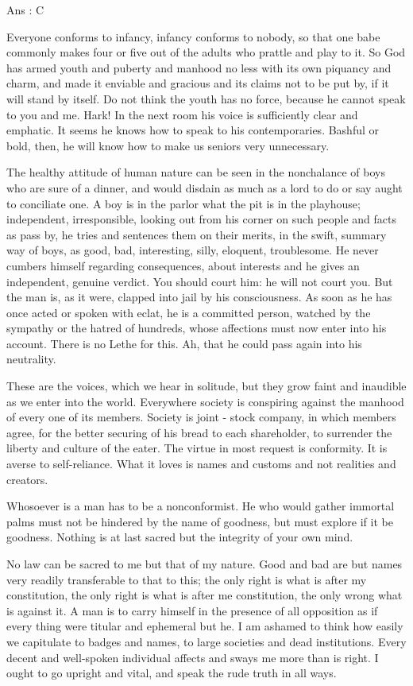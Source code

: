     Ans : C 


Everyone conforms to infancy, infancy conforms to nobody, so that one babe commonly makes four or five out of the adults who prattle and play to it. So God has armed youth and puberty and manhood no less with its own piquancy and charm, and made it enviable and gracious and its claims not to be put by, if it will stand by itself. Do not think the youth has no force, because he cannot speak to you and me. Hark! In the next room his voice is sufficiently clear and emphatic. It seems he knows how to speak to his contemporaries. Bashful or bold, then, he will know how to make us seniors very unnecessary.

The healthy attitude of human nature can be seen in the nonchalance of boys who are sure of a dinner, and would disdain as much as a lord to do or say aught to conciliate one. A boy is in the parlor what the pit is in the playhouse; independent, irresponsible, looking out from his corner on such people and facts as pass by, he tries and sentences them on their merits, in the swift, summary way of boys, as good, bad, interesting, silly, eloquent, troublesome. He never cumbers himself regarding consequences, about interests and he gives an independent, genuine verdict. You should court him: he will not court you. But the man is, as it were, clapped into jail by his consciousness. As soon as he has once acted or spoken with eclat, he is a committed person, watched by the sympathy or the hatred of hundreds, whose affections must now enter into his account. There is no Lethe for this. Ah, that he could pass again into his neutrality.

These are the voices, which we hear in solitude, but they grow faint and inaudible as we enter into the world. Everywhere society is conspiring against the manhood of every one of its members. Society is joint - stock company, in which members agree, for the better securing of his bread to each shareholder, to surrender the liberty and culture of the eater. The virtue in most request is conformity. It is averse to self-reliance. What it loves is names and customs and not realities and creators.

Whosoever is a man has to be a nonconformist. He who would gather immortal palms must not be hindered by the name of goodness, but must explore if it be goodness. Nothing is at last sacred but the integrity of your own mind.

No law can be sacred to me but that of my nature. Good and bad are but names very readily transferable to that to this; the only right is what is after my constitution, the only right is what is after me constitution, the only wrong what is against it. A man is to carry himself in the presence of all opposition as if every thing were titular and ephemeral but he. I am ashamed to think how easily we capitulate to badges and names, to large societies and dead institutions. Every decent and well-spoken individual affects and sways me more than is right. I ought to go upright and vital, and speak the rude truth in all ways.

